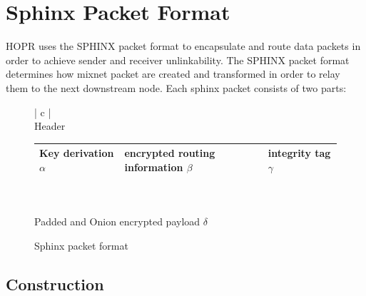 \section{Sphinx Packet Format}

HOPR uses the SPHINX packet format \cite{sphinxpaper} to encapsulate and route data packets in order to achieve sender and receiver unlinkability. The SPHINX packet format determines how mixnet packet are created and transformed in order to relay them to the next downstream node. Each sphinx packet consists of two parts:

\begin{figure}[H]
    \begin{center}
        \begin{tabular}{| c |}
            \hline
            \\[-0.8em]
            Header                    \\[0.2em]
            \begin{tabular}{| m{} | m{} | m{} |}
                \hline
                Key derivation $\alpha$& encrypted routing information $\beta$& integrity tag $\gamma$\\
                \hline
            \end{tabular} \\[0.9em]
            \hline
            \hline
            \\[-0.7em]
            Padded and Onion encrypted payload  $\delta$                   \\[0.7em]
            \hline
        \end{tabular}
    \end{center}
    \label{fig:Sphinx packet format}
    \caption{Sphinx packet format}
\end{figure}

\subsection{Construction}

